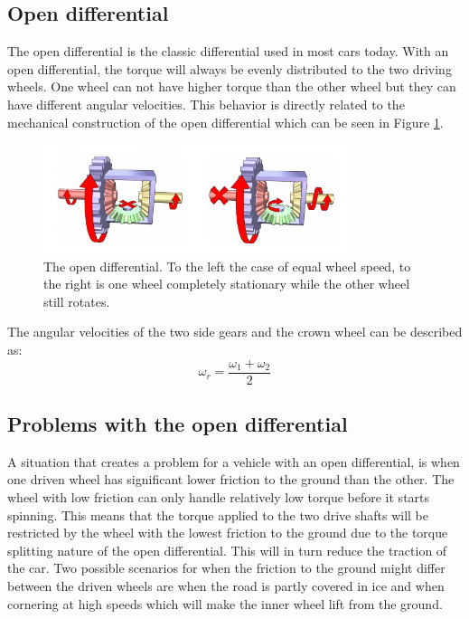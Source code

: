 \subsection{Open differential}
The open differential is the classic differential used in most cars today. With an open differential, the torque will always be evenly distributed to the two driving wheels. One wheel can not have higher torque than the other wheel but they can have different angular velocities. This behavior is directly related to the mechanical construction of the open differential which can be seen in Figure \ref{wikidiff}. 
\begin{figure}[h]
	\centering
	\includegraphics[width=0.8\textwidth]{Pictures/opendiff}
	\caption{The open differential. To the left the case of equal wheel speed, to the right is one wheel completely stationary while the other wheel still rotates. \cite{wikidiff}}
	\label{wikidiff}
\end{figure}
The angular velocities of the two side gears and the crown wheel can be described as:
\begin{equation}
\omega_{r} = \frac{\omega_{1} + \omega_{2}}{2}
\label{eq:diff}
\end{equation}

\subsection{Problems with the open differential}
A situation that creates a problem for a vehicle with an open differential, is when one driven wheel has significant lower friction to the ground than the other. The wheel with low friction can only handle relatively low torque before it starts spinning. This means that the torque applied to the two drive shafts will be restricted by the wheel with the lowest friction to the ground due to the torque splitting nature of the open differential. This will in turn reduce the traction of the car. Two possible scenarios for when the friction to the ground might differ between the driven wheels are when the road is partly covered in ice and when cornering at high speeds which will make the inner wheel lift from the ground. 

